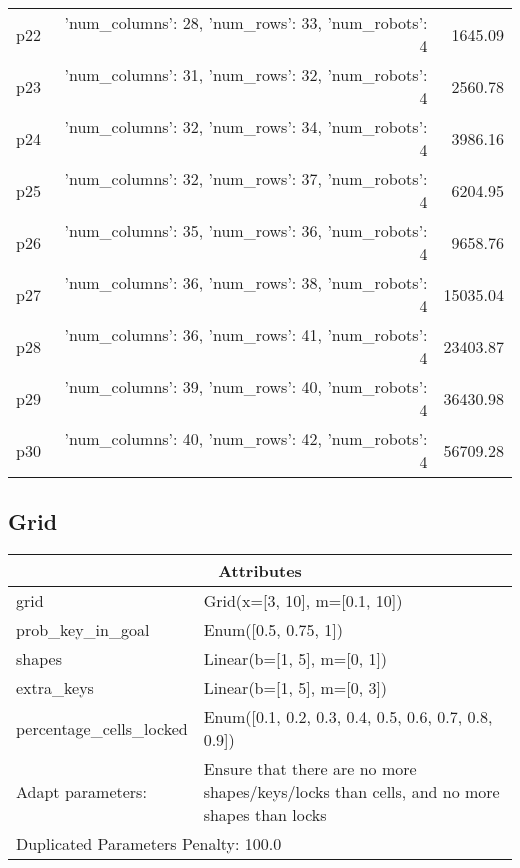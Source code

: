 \documentclass{article}
\begin{document}
\begin{center}
\begin{tabular}{@{}l|r|r@{}}
  p22&{'num\_columns': 28, 'num\_rows': 33, 'num\_robots': 4}&1645.09\\
  p23&{'num\_columns': 31, 'num\_rows': 32, 'num\_robots': 4}&2560.78\\
  p24&{'num\_columns': 32, 'num\_rows': 34, 'num\_robots': 4}&3986.16\\
  p25&{'num\_columns': 32, 'num\_rows': 37, 'num\_robots': 4}&6204.95\\
  p26&{'num\_columns': 35, 'num\_rows': 36, 'num\_robots': 4}&9658.76\\
  p27&{'num\_columns': 36, 'num\_rows': 38, 'num\_robots': 4}&15035.04\\
  p28&{'num\_columns': 36, 'num\_rows': 41, 'num\_robots': 4}&23403.87\\
  p29&{'num\_columns': 39, 'num\_rows': 40, 'num\_robots': 4}&36430.98\\
  p30&{'num\_columns': 40, 'num\_rows': 42, 'num\_robots': 4}&56709.28
                            \end{tabular}
                            \end{center}
                    
                            \newpage \subsection{Grid}
                    \begin{center}
                    \begin{tabular}{@{}p{}p{}@{}}
                    \multicolumn{2}{c}{\bf \large Attributes}\\\midrule
                    grid & Grid(x=[3, 10], m=[0.1, 10])\\
prob\_key\_in\_goal & Enum([0.5, 0.75, 1])\\
shapes & Linear(b=[1, 5], m=[0, 1])\\
extra\_keys & Linear(b=[1, 5], m=[0, 3])\\
percentage\_cells\_locked & Enum([0.1, 0.2, 0.3, 0.4, 0.5, 0.6, 0.7, 0.8, 0.9])
                    \\\midrule
                    Adapt parameters: & Ensure that there are no more shapes/keys/locks than cells, and no more shapes than locks \\\midrule
                    \multicolumn{2}{l}{Duplicated Parameters Penalty: 100.0}
                    \end{tabular}
                    \end{center}
                
\end{document}
